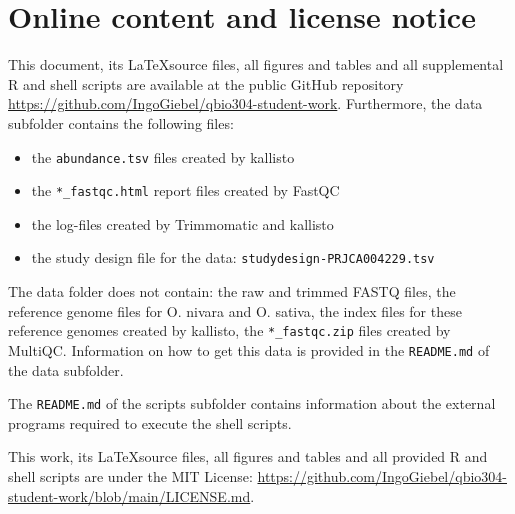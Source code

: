 \section{Online content and license notice}

This document, its \LaTeX source files, all figures and tables and all supplemental R and shell scripts are available at the public GitHub repository \url{https://github.com/IngoGiebel/qbio304-student-work}. Furthermore, the data subfolder contains the following files:
\begin{itemize}
    \item the \verb|abundance.tsv| files created by kallisto
    \item the \verb|*_fastqc.html| report files created by FastQC
    \item the log-files created by Trimmomatic and kallisto
    \item the study design file for the data: \verb|studydesign-PRJCA004229.tsv|
\end{itemize}
The data folder does not contain: the raw and trimmed FASTQ files, the reference genome files for O. nivara and O. sativa, the index files for these reference genomes created by kallisto, the \verb|*_fastqc.zip| files created by MultiQC. Information on how to get this data is provided in the \verb|README.md| of the data subfolder.

The \verb|README.md| of the scripts subfolder contains information about the external programs required to execute the shell scripts.

This work, its \LaTeX source files, all figures and tables and all provided R and shell scripts are under the MIT License: \url{https://github.com/IngoGiebel/qbio304-student-work/blob/main/LICENSE.md}.